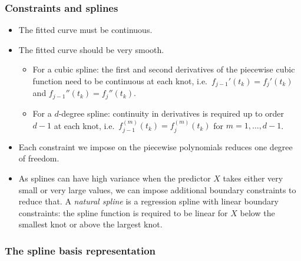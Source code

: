 \documentclass{article}
\begin{document}
\subsubsection{Constraints and splines}
\begin{itemize}
  \item The fitted curve must be continuous.
  \item The fitted curve should be very smooth.
    \begin{itemize}
      \item For a cubic spline: the first and second derivatives of the piecewise cubic function need to be continuous at each knot, i.e.\ 
        $f_{j-1}'(t_k)=f_{j}'(t_k)$ and $f_{j-1}''(t_k)=f_{j}''(t_k)$.
      \item For a $d$-degree spline: continuity in derivatives is required up to order $d-1$ at each knot, i.e.\ 
        $f_{j-1}^{(m)}(t_k)=f_{j}^{(m)}(t_k)$ for $m=1,\dots,d-1$.
    \end{itemize}
  \item Each constraint we impose on the piecewise polynomials reduces one degree of freedom.
  \item As splines can have high variance when the predictor $X$ takes either very small or very large values, we can impose additional boundary constraints to reduce that. A \emph{natural spline} is a regression spline with linear boundary constraints: the spline function is required to be linear for $X$ below the smallest knot or above the largest knot.
\end{itemize}

\subsubsection{The spline basis representation}
\end{document}
